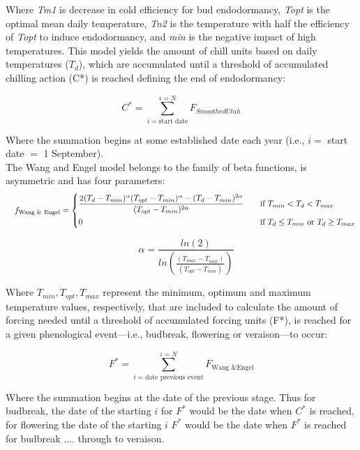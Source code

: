 \documentclass[11pt,letter]{article}
\begin{document}
Where \emph{Tm1} is decrease in cold efficiency for bud endodormancy, \emph{Topt} is the optimal mean daily temperature, \emph{Tn2} is the temperature with half the efficiency of \emph{Topt} to induce endodormancy, and \emph{min} is the negative impact of high temperatures. This model yields the amount of chill units based on daily temperatures ($T_d$), which are accumulated until a threshold of accumulated chilling action (C*) is reached defining the end of endodormancy:

\begin{equation}
C^* = \sum_{i=\text{start date}}^{i=N}F_{SmoothedUtah}
\end{equation} 

Where the summation begins at some established date each year (i.e., $i=$ start date $=$ 1 September). \\

The Wang and Engel model \citep{wang1998simulation} belongs to the family of beta functions, is asymmetric and has four parameters: 
\begin{equation}
\quad	f_{\text{Wang \& Engel}} = 
\begin{dcases}
\frac{2(T_d-T_{min})^\alpha(T_{opt}-T_{min})^\alpha - (T_d-T_{min})^{2\alpha}}{(T_{opt}-T_{min})^{2\alpha}}    & \quad \text{if } T_{min}<T_{d}<T_{max} \\
0 & \quad \text{if } T_{d} \leq T_{min} \text{ or } T_d \geq T_{max}
\end{dcases}
\end{equation}

\begin{equation}
\quad	\alpha = \frac{ln(2)}{ln(\frac{(T_{max}-T_{min})}{(T_{opt}-T_{min})})}
 \end{equation} 

Where $T_{min}, T_{opt}, T_{max}$ represent the minimum, optimum and maximum temperature values, respectively, that are included to calculate the amount of forcing needed until a threshold of accumulated forcing units (F*), is reached for a given phenological event---i.e., budbreak, flowering or veraison---to occur:

\begin{equation}
F^* = \sum_{i=\text{date previous event}}^{i=N} F_{\text{Wang \& Engel}}
\end{equation} 

Where the summation begins at the date of the previous stage. Thus for budbreak, the date of the starting $i$ for $F^*$ would be the date when $C^*$ is reached, for flowering the date of the starting $i$ $F^*$ would be the date when $F^*$ is reached for budbreak .... through to veraison. \\
\end{document}
